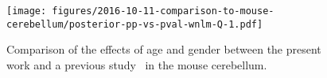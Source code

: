\documentclass[letterpaper]{article}
\begin{document}
\begin{figure}
\texttt{[image: figures/2016-10-11-comparison-to-mouse-cerebellum/posterior-pp-vs-pval-wnlm-Q-1.pdf]}
\caption{Comparison of the effects of age and gender between the present work and a
previous study~\cite{Perez2015} in the mouse cerebellum. }
\label{fig:mouse-cerebellum}
\end{figure}


\setcounter{table}{0}
\makeatletter 
\renewcommand{\thetable}{S\@arabic\c@table}
\makeatother
\end{document}
